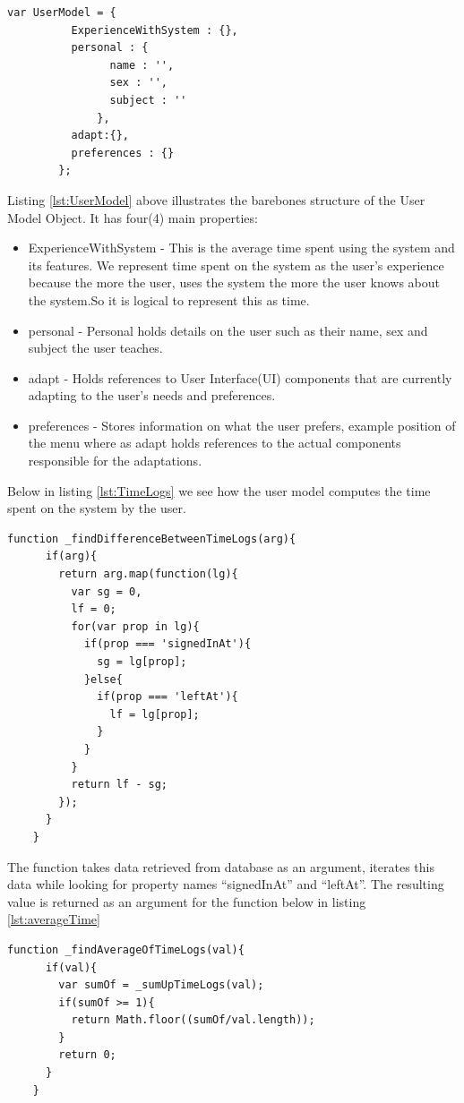 \begin{lstlisting}[caption={User Model Object Definition}, label={lst:UserModel}]
    var UserModel = {
          ExperienceWithSystem : {},
          personal : {
                name : '',
                sex : '',
                subject : ''
              },
          adapt:{},
          preferences : {}
        };
\end{lstlisting}

Listing \ref{lst:UserModel} above illustrates the barebones structure of the User Model Object. It has four(4) main properties:
\begin{itemize}
    \item ExperienceWithSystem - This is the average time spent using the system and its features. We represent time spent on the system as the user's experience because the more the user, uses the system the more the user knows about the system.So it is logical to represent this as time.
    \item personal - Personal holds details on the user such as their name, sex and subject the user teaches.
    \item adapt - Holds references to User Interface(UI) components that are currently adapting to the user's needs and preferences.
    \item preferences - Stores information on what the user prefers, example position of the menu where as adapt holds references to the actual components responsible for the adaptations.
\end{itemize}
Below in listing \ref{lst:TimeLogs} we see how the user model computes the time spent on the system by the user.
\begin{lstlisting}[caption={Calculating time spent on the system}, label={lst:TimeLogs}]
    function _findDifferenceBetweenTimeLogs(arg){
      if(arg){
        return arg.map(function(lg){
          var sg = 0,
          lf = 0;
          for(var prop in lg){
            if(prop === 'signedInAt'){
              sg = lg[prop];
            }else{
              if(prop === 'leftAt'){
                lf = lg[prop];
              }
            }
          }
          return lf - sg;
        });
      }
    }
\end{lstlisting}
The function takes data retrieved from database as an argument, iterates this data while looking for property names ``signedInAt'' and ``leftAt''. The resulting value is returned as an argument for the function below in listing \ref{lst:averageTime}

\begin{lstlisting}[caption={Computes average time}, label={lst:averageTime}]
    function _findAverageOfTimeLogs(val){
      if(val){
        var sumOf = _sumUpTimeLogs(val);
        if(sumOf >= 1){
          return Math.floor((sumOf/val.length));
        }
        return 0;
      }
    }
\end{lstlisting}

